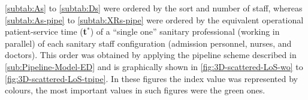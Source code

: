 \documentclass[11pt]{article} %
\begin{document}
\ref{subtab:As} to \ref{subtab:Ds} were ordered by the sort and
number of staff, whereas \ref{subtab:As-pipe} to \ref{subtab:XRs-pipe}
were ordered by the equivalent operational patient-service time ({\bf t$^*$})
of a ``single one'' sanitary professional (working in parallel)
of each sanitary staff configuration (admission personnel, nurses, and
doctors). This order was obtained by applying
the pipeline scheme described in \ref{sub:Pipeline-Model-ED} and
is graphically shown in \ref{fig:3D-scattered-LoS-wo} to \ref{fig:3D-scattered-LoS-tpipe}.
In these figures the index value was represented by colours, the most
important values in such figures were the green ones. 

\begin{table}[h]
\caption{  %
Ordering staff configuration of admission personnel according to the
equivalent operational patient-service time ({\bf t$^*$})
of each staff configuration.\label{subtab:As-pipe} %
}
\centering{}  %
\end{table}
 
\end{document}
